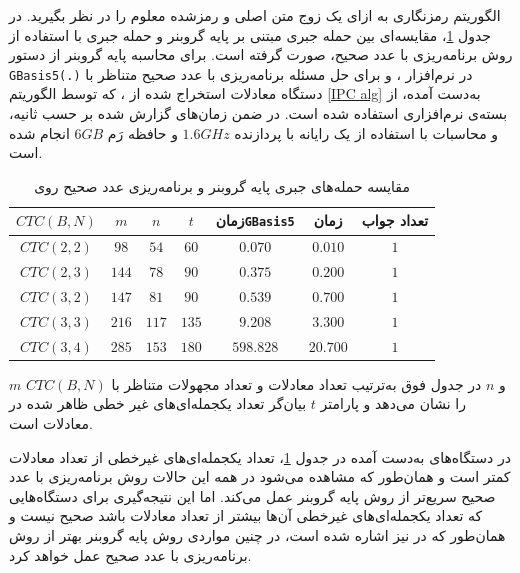 \begin{example}
الگوریتم رمزنگاری 
به ازای یک زوج متن اصلی و رمزشده معلوم  را در نظر بگیرید.  در  جدول 
\ref{IP-GB_compar}، 
 مقایسه‌ای بین حمله جبری مبتنی بر پایه گروبنر و حمله جبری با استفاده از روش برنامه‌ریزی با عدد صحیح، صورت گرفته است.  برای محاسبه پایه گروبنر از دستور 
\verb|GBasis5(.)|
در نرم‌افزار 
، 
و برای حل مسئله برنامه‌ریزی با عدد صحیح متناظر با دستگاه معادلات استخراج شده  از 
، 
 که توسط الگوریتم 
\ref{IPC alg}
به‌دست آمده، از بسته‌ی نرم‌افزاری 
\cite{GLPK}
استفاده شده است. در ضمن  زمان‌های گزارش شده بر حسب ثانیه،  و محاسبات با استفاده از یک رایانه با پردازنده‌
$1.6GHz$
و حافظه رَم  
$6GB$
انجام شده است. 
\begin{table}
\begin{center}
	\begin{tabular}{||c||c|c|c|c|c|c||}
	\hline 
	$CTC(B,N)$ & $m$ & $n$ & $t$ & زمان\verb|GBasis5| & زمان \en{GLPK}&{\tiny  تعداد جواب} \\ 
	\hline 
	\hline
	$CTC(2,2)$ & $98$ & $54$ & $60$ & $0.070$ & $0.010$& $1$ \\ 
	\hline 
	$CTC(2,3)$ & $144$& $78$  & $90$ & $0.375$ & $0.200$& $1$ \\ 
	\hline 
	$CTC(3,2)$ & $147$& $81$  & $90$ & $0.539$ & $0.700$& $1$ \\ 
	\hline 
	$CTC(3,3)$ & $216$& $117$  & $135$ & $9.208$ & $3.300$& $1$\\ 
	\hline 
	$CTC(3,4)$ &$285$& $153$  & $180$ & $598.828$ & $20.700$& $1$ \\ 
	\hline 
\end{tabular}
\end{center} 
\caption{مقایسه حمله‌های جبری پایه گروبنر و برنامه‌ریزی عدد صحیح روی 
}
\label{IP-GB_compar}
\end{table}
$m$
و
$n$
در جدول فوق به‌ترتیب تعداد معادلات و تعداد مجهولات متناظر با 
$CTC(B,N)$
را نشان می‌دهد و پارامتر 
$t$
بیان‌گر تعداد یکجمله‌ای‌های غیر خطی ظاهر شده در معادلات است.

 در دستگاه‌های به‌دست آمده در جدول 
\ref{IP-GB_compar}، 
تعداد  یکجمله‌ای‌های غیرخطی از تعداد معادلات کمتر است و همان‌طور که مشاهده می‌شود در همه این حالات روش برنامه‌ریزی با عدد صحیح سریع‌تر از روش پایه‌ گروبنر عمل می‌کند. اما این نتیجه‌گیری برای دستگاه‌هایی که تعداد  یکجمله‌ای‌های غیرخطی آن‌ها بیشتر از تعداد معادلات باشد صحیح نیست  و  همان‌طور که در 
\cite{kreuzer2009algebraic}
نیز اشاره شده است،  در چنین مواردی روش پایه گروبنر بهتر از روش برنامه‌ریزی با عدد صحیح عمل خواهد کرد. 
\end{example}
